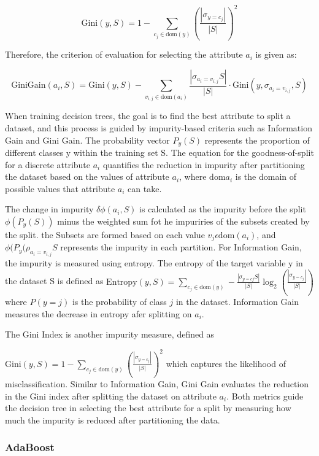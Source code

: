 \documentclass[12pt, a4paper,twoside]{report}
\numberwithin{equation}{chapter}
\begin{document}
\begin{itemize}
\[
\text{Gini}(y, S) = 1 - \sum_{c_j \in \text{dom}(y)} \left(\frac{|\sigma_{y = c_j}|}{|S|}\right)^2
\]

Therefore, the criterion of evaluation for selecting the attribute \(a_i\) is given as:


\[
\text{GiniGain}(a_i, S) = \text{Gini}(y, S) - \sum_{v_{i,j} \in \text{dom}(a_i)} \frac{|\sigma_{a_i = v_{i,j}}S|}{|S|} \cdot \text{Gini}(y, \sigma_{a_i = v_{i,j}}, S)
\]

When training decision trees, the goal is to find the best attribute to split a dataset, and this process is guided by impurity-based criteria such as Information Gain and Gini Gain. The probability vector \(P_y (S)\) represents the proportion of different classes y within the training set S. The equation for the goodness-of-split for a discrete attribute \(a_i\) quantifies the reduction in impurity after partitioning the dataset based on the values of attribute \(a_i\), where \(\text{dom}a_i\) is the domain of possible values that attribute \(a_i\) can take. 

The change in impurity \(\delta\phi(a_i, S)\) is calculated as the impurity before the split \(\phi(P_y(S))\) minus the weighted sum fot he impuriries of the subsets created by the split. the Subsets are formed based on each value \(v_j\epsilon\text{dom}(a_i)\), and \(\phi(P_y(\rho_{a_i=v_{i,j}}S\) represents the impurity in each partition. 
For Information Gain, the impurity is measured using entropy. The entropy of the target variable y in the dataset S is defined as \(\text{Entropy}(y, S) = \sum_{c_j \in \text{dom}(y)} - \frac{|\sigma_{y = cj}S|}{|S|} \log_2 \left(\frac{|\sigma_{y = c_j}|}{|S|}\right)
\) where \(P(y=j)\) is the probability of class \(j\) in the dataset. Information Gain measures the decrease in entropy afer splitting on \(a_i\).

The Gini Index is another impurity measure, defined as

\(\text{Gini}(y, S) = 1 - \sum_{c_j \in \text{dom}(y)} \left(\frac{|\sigma_{y = c_j}|}{|S|}\right)^2\) which captures the likelihood of misclassification. Similar to Information Gain, Gini Gain evaluates the reduction in the Gini index after splitting the dataset on attribute \(a_i\). Both metrics guide the decision tree in selecting the best attribute for a split by measuring how much the impurity is reduced after partitioning the data.

\end{itemize}

\subsubsection{AdaBoost}
\end{document}

